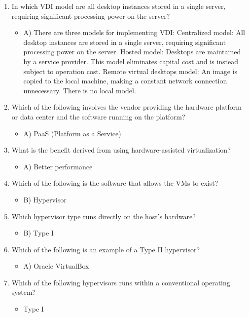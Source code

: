 \documentclass{article}
\begin{document}
\begin{enumerate}
\begin{itemize}
    \end{itemize}
    \item In which VDI model are all desktop instances stored in a single server, requiring significant
processing power on the server?
    \begin{itemize}
        \item A) There are three models for implementing VDI:
Centralized model: All desktop instances are stored in a single server, requiring significant
processing power on the server.
Hosted model: Desktops are maintained by a service provider. This model eliminates capital
cost and is instead subject to operation cost.
Remote virtual desktops model: An image is copied to the local machine, making a constant
network connection unnecessary.
There is no local model.
    \end{itemize}
    \item Which of the following involves the vendor providing the hardware platform or data center
and the software running on the platform?
    \begin{itemize}
        \item A) PaaS (Platform as a Service) 
    \end{itemize}
    \item What is the benefit derived from using hardware-assisted virtualization?
    \begin{itemize}
        \item A) Better performance 
    \end{itemize}
    \item Which of the following is the software that allows the VMs to exist?
    \begin{itemize}
        \item B) Hypervisor
    \end{itemize}
    \item Which hypervisor type runs directly on the host’s hardware?
    \begin{itemize}
        \item B) Type I 
    \end{itemize}
    \item Which of the following is an example of a Type II hypervisor?
    \begin{itemize}
        \item A) Oracle VirtualBox
    \end{itemize}
    \item Which of the following hypervisors runs within a conventional operating system?
    \begin{itemize}
        \item Type I 
    \end{itemize}
\end{enumerate}
\end{document}
